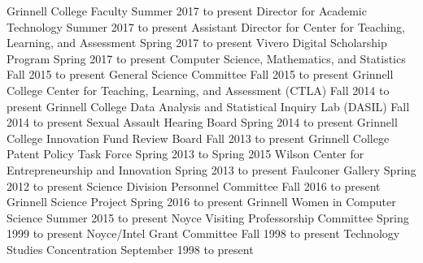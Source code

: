 \begin{cventries}


  {Grinnell College Faculty}
  {Summer 2017 to present}
  {Director for Academic Technology}
  {Summer 2017 to present}
  {Assistant Director for Center for Teaching, Learning, and Assessment}
  {Spring 2017 to present}
  {Vivero Digital Scholarship Program}
  {Spring 2017 to present}
  {Computer Science, Mathematics, and Statistics}
  {Fall 2015 to present}
  {General Science Committee}
  {Fall 2015 to present}
  {Grinnell College Center for Teaching, Learning, and Assessment (CTLA)}
  {Fall 2014 to present}
  {Grinnell College Data Analysis and Statistical Inquiry Lab (DASIL)}
  {Fall 2014 to present}
  {Sexual Assault Hearing Board}
  {Spring 2014 to present}
  {Grinnell College Innovation Fund Review Board}
  {Fall 2013 to present}
  {Grinnell College Patent Policy Task Force}
  {Spring 2013 to Spring 2015}
  {Wilson Center for Entrepreneurship and Innovation}
  {Spring 2013 to present}
  {Faulconer Gallery}
  {Spring 2012 to present}
  {Science Division Personnel Committee}
  {Fall 2016 to present}
  {Grinnell Science Project}
  {Spring 2016 to present}
  {Grinnell Women in Computer Science}
  {Summer 2015 to present}
  {Noyce Visiting Professorship Committee}
  {Spring 1999 to present}
  {Noyce/Intel Grant Committee}
  {Fall 1998 to present}
  {Technology Studies Concentration}
  {September 1998 to present}

\vspace{1mm}



\end{cventries}
